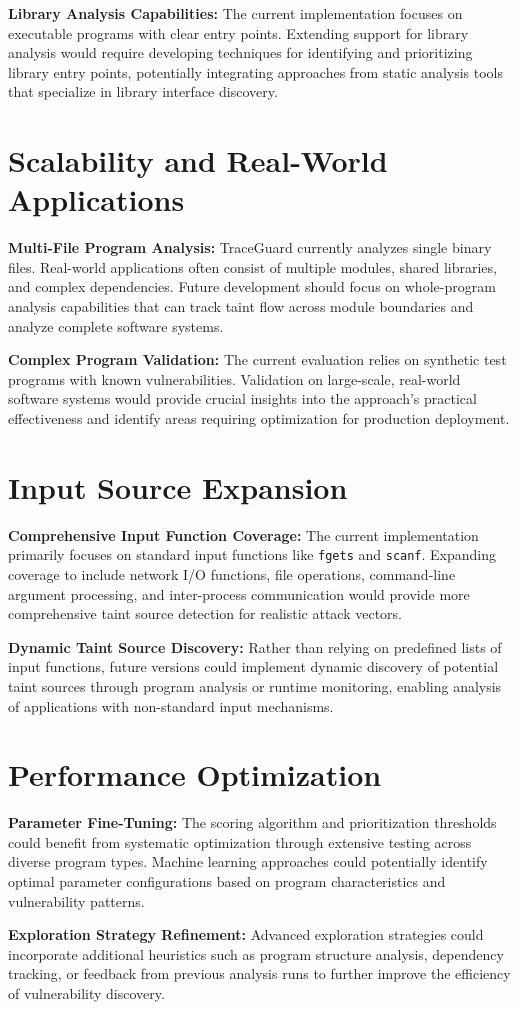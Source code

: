 \textbf{Library Analysis Capabilities:} The current implementation focuses on executable programs with clear entry points. Extending support for library analysis would require developing techniques for identifying and prioritizing library entry points, potentially integrating approaches from static analysis tools that specialize in library interface discovery.

\section{Scalability and Real-World Applications}

\textbf{Multi-File Program Analysis:} TraceGuard currently analyzes single binary files. Real-world applications often consist of multiple modules, shared libraries, and complex dependencies. Future development should focus on whole-program analysis capabilities that can track taint flow across module boundaries and analyze complete software systems.

\textbf{Complex Program Validation:} The current evaluation relies on synthetic test programs with known vulnerabilities. Validation on large-scale, real-world software systems would provide crucial insights into the approach's practical effectiveness and identify areas requiring optimization for production deployment.

\section{Input Source Expansion}

\textbf{Comprehensive Input Function Coverage:} The current implementation primarily focuses on standard input functions like \texttt{fgets} and \texttt{scanf}. Expanding coverage to include network I/O functions, file operations, command-line argument processing, and inter-process communication would provide more comprehensive taint source detection for realistic attack vectors.

\textbf{Dynamic Taint Source Discovery:} Rather than relying on predefined lists of input functions, future versions could implement dynamic discovery of potential taint sources through program analysis or runtime monitoring, enabling analysis of applications with non-standard input mechanisms.

\section{Performance Optimization}

\textbf{Parameter Fine-Tuning:} The scoring algorithm and prioritization thresholds could benefit from systematic optimization through extensive testing across diverse program types. Machine learning approaches could potentially identify optimal parameter configurations based on program characteristics and vulnerability patterns.

\textbf{Exploration Strategy Refinement:} Advanced exploration strategies could incorporate additional heuristics such as program structure analysis, dependency tracking, or feedback from previous analysis runs to further improve the efficiency of vulnerability discovery.
